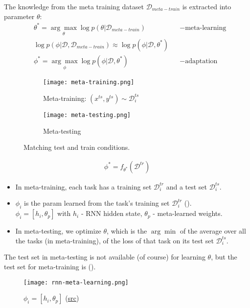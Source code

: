 The knowledge from the meta training dataset $\mathcal{D}_{meta-train}$ is extracted into parameter $\theta$:
\begin{align}
	&\theta^* = \underset{\theta}{\arg\max} \log p(\theta | \mathcal{D}_{meta-train}) && -\text{meta-learning} \\
	&\log p(\phi | \mathcal{D}, \mathcal{D}_{meta-train}) \approx \log p(\phi | \mathcal{D}, \theta^*)\\
	&\phi^* = \underset{\phi}{\arg\max} \log p(\phi | \mathcal{D}, \theta^*) && -\text{adaptation}
\end{align}

\begin{figure}[hbt!]
	\centering
	\begin{subfigure}[b]{0.45\textwidth}
		\texttt{[image: meta-training.png]}
		\caption{Meta-training: $(x^{ts}, y^{ts}) \sim \mathcal{D}_i^{ts}$}
	\end{subfigure}
	\hfil
	\begin{subfigure}[b]{0.45\textwidth}
		\texttt{[image: meta-testing.png]}
		\caption{Meta-testing}
	\end{subfigure}
	\caption{Matching test and train conditions.}
\end{figure}

\begin{align}
	\phi^* = f_{\theta^*} (\mathcal{D}^{tr})
\end{align}


\begin{itemize}
	\item In meta-training, each task has a training set $\mathcal{D}^{tr}_i$ and a test set $\mathcal{D}^{ts}_i$.
	\item $\phi_i$ is the \ac{param} learned from the task's training set $\mathcal{D}^{tr}_i$ ().\\
	$\phi_i = [h_i, \theta_p]$ with $h_i$ - \ac{RNN} hidden state, $\theta_p$ - meta-learned weights.
	\item In meta-testing, we optimize $\theta$, which is the $\arg\min$ of the average over all the tasks (in meta-training), of the loss of that task on its test set $\mathcal{D}^{ts}_i$.
\end{itemize}
\note The test set in meta-testing is not available (of course) for learning $\theta$, but the test set for meta-training is ().

\begin{figure}[hbt!]
	\centering
	\texttt{[image: rnn-meta-learning.png]}
	\caption{$\phi_i = [h_i, \theta_p]$ (\href{http://rail.eecs.berkeley.edu/deeprlcourse/static/slides/lec-22.pdf}{src})}
	\label{fig:rnn-meta-learning}
\end{figure}

